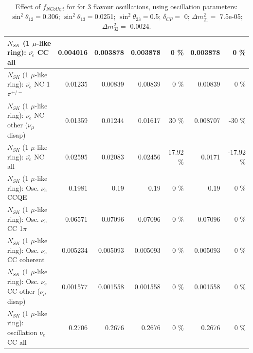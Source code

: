 \begin{table}
\begin{tabular}{| l | r | r | r  r | r  r |}
                            $N_{SK}$ (1 $\mu$-like ring): $\bar{\nu_{e}}$ CC all &        0.004016 &        0.003878 &        0.003878 &        0 \%  &        0.003878 &        0 \%  \\ 
\hline
                     $N_{SK}$ (1 $\mu$-like ring): $\bar{\nu_e}$ NC 1$\pi^{+/-}$ &         0.01235 &         0.00839 &         0.00839 &        0 \%  &         0.00839 &        0 \%  \\ 
          $N_{SK}$ (1 $\mu$-like ring): $\bar{\nu_e}$ NC other ($\nu_\mu$ disap) &         0.01359 &         0.01244 &         0.01617 &       30 \%  &        0.008707 &      -30 \%  \\ 
                            $N_{SK}$ (1 $\mu$-like ring): $\bar{\nu_{e}}$ NC all &         0.02595 &         0.02083 &         0.02456 &    17.92 \%  &          0.0171 &   -17.92 \%  \\ 
\hline
\hline
\hline
                                 $N_{SK}$ (1 $\mu$-like ring): Osc. $\nu_e$ CCQE &          0.1981 &            0.19 &            0.19 &        0 \%  &            0.19 &        0 \%  \\ 
                            $N_{SK}$ (1 $\mu$-like ring): Osc. $\nu_e$ CC 1$\pi$ &         0.06571 &         0.07096 &         0.07096 &        0 \%  &         0.07096 &        0 \%  \\ 
                          $N_{SK}$ (1 $\mu$-like ring): Osc. $\nu_e$ CC coherent &        0.005234 &        0.005093 &        0.005093 &        0 \%  &        0.005093 &        0 \%  \\ 
           $N_{SK}$ (1 $\mu$-like ring): Osc. $\nu_e$ CC other ($\nu_\mu$ disap) &        0.001577 &        0.001558 &        0.001558 &        0 \%  &        0.001558 &        0 \%  \\ 
                        $N_{SK}$ (1 $\mu$-like ring): oscillation $\nu_e$ CC all &          0.2706 &          0.2676 &          0.2676 &        0 \%  &          0.2676 &        0 \%  \\ 
\hline
\hline
\end{tabular}
\caption{ Effect of $f_{NCoth; t}$ for for 3 flavour oscillations, using oscillation parameters:  $\sin^2\theta_{12} = $0.306; $\sin^2\theta_{13} = $0.0251; $\sin^2\theta_{23} = $0.5; $\delta_{CP} = $        0; $\Delta m^2_{21} = $    7.5e-05; $\Delta m^2_{32} = $    0.0024. }
\label{tab:num_xsec_norm_ncoth_1RmuT_3f_osc_t13:0.0251}
\end{table}
\clearpage
